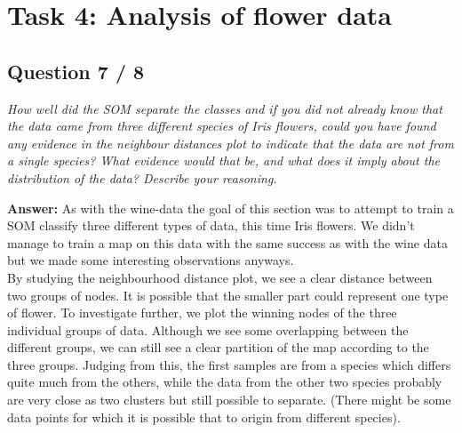 \documentclass[a4paper]{article}
\begin{document}
\pagebreak
\section*{Task 4: Analysis of flower data}

 


\subsection*{Question 7 / 8}
\emph{How well did the SOM separate the classes and if you did not already know that the data came from three different species of Iris flowers, could you have found any evidence in the neighbour distances plot to indicate that the data are not from a single species? What evidence would that be, and what does it imply about the distribution of the data?
Describe your reasoning.}

 \textbf{Answer: } As with the wine-data the goal of this section was to attempt to train a SOM classify three different types of data, this time Iris flowers. We didn't manage to train a map on this data with the same success as with the wine data but we made some interesting observations anyways. \\ By studying the neighbourhood distance plot, we see a clear distance between two groups of nodes. It is possible that the smaller part could represent one type of flower. To investigate further, we plot the winning nodes of the three individual groups of data. Although we see some overlapping between the different groups, we can still see a clear partition of the map according to the three groups. Judging from this, the first samples are from a species which differs quite much from the others, while the data from the other two species probably are very close as two clusters but still possible to separate. (There might be some data points for which it is possible that to origin from different species).
\end{document}
